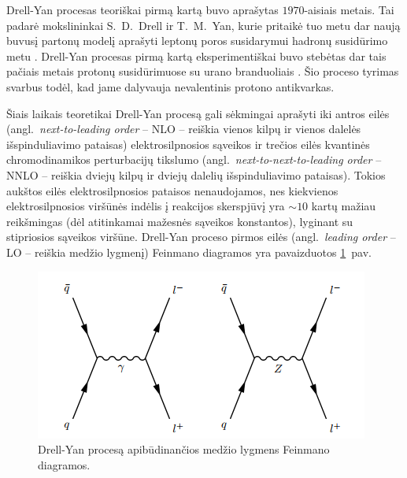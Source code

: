 \documentclass[a4paper, 12pt, oneside]{article}
\begin{document}
Drell-Yan procesas teoriškai pirmą kartą buvo aprašytas $1970$-aisiais metais.
Tai padarė mokslininkai S.~D.~Drell ir T.~M.~Yan, kurie pritaikė tuo metu dar naują buvusį partonų modelį aprašyti
leptonų poros susidarymui hadronų susidūrimo metu \cite{DYoriginal}.
Drell-Yan procesas pirmą kartą eksperimentiškai buvo stebėtas dar tais pačiais metais protonų susidūrimuose
su urano branduoliais \cite{DY_firstExp}.
Šio proceso tyrimas svarbus todėl, kad jame dalyvauja nevalentinis protono antikvarkas.

Šiais laikais teoretikai Drell-Yan procesą gali sėkmingai aprašyti iki antros eilės (angl.\ \textit{next-to-leading order} -- NLO --
reiškia vienos kilpų ir vienos dalelės išspinduliavimo pataisas) elektrosilpnosios sąveikos
ir trečios eilės kvantinės chromodinamikos perturbacijų tikslumo (angl.\ \textit{next-to-next-to-leading order} -- NNLO --
reiškia dviejų kilpų ir dviejų dalelių išspinduliavimo pataisas).
Tokios aukštos eilės elektrosilpnosios pataisos nenaudojamos, nes kiekvienos elektrosilpnosios viršūnės
indėlis į reakcijos skerspjūvį yra $\sim\!10$ kartų mažiau reikšmingas (dėl atitinkamai mažesnės sąveikos konstantos), lyginant su
stipriosios sąveikos viršūne.
Drell-Yan proceso pirmos eilės (angl.\ \textit{leading order} -- LO -- reiškia medžio lygmenį) Feinmano diagramos
yra pavaizduotos \ref{fig:DYfeyn}~pav.

\begin{figure}[t]
\centering
\includegraphics[scale=0.75]{DYprocess.PNG}
\caption{Drell-Yan procesą apibūdinančios medžio lygmens Feinmano diagramos.}
\label{fig:DYfeyn}
\end{figure}
\end{document}
